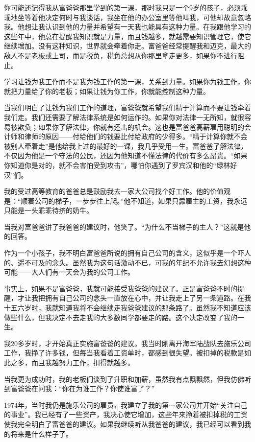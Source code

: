 你可能还记得我从富爸爸那里学到的第一课，那时我只是一个9岁的孩子，必须乖乖地坐等着他决定何时与我谈话，我坐在他的办公室里等他叫我，可他却故意忽略我。他想让我认识到他的力量并希望有一天我也能具有这种力量。在我跟他学习的这些年中，他总在提醒我知识就是力量，而且钱越多，就越需要知识管理它，使它继续增加。没有这种知识，世界就会牵着你走。富爸爸经常提醒我和迈克，最大的敌人不是老板或上司，而是税负，税负总想从你那里拿走更多，如果你不进行阻止。

学习让钱为我工作而不是我为钱工作的第一课，关系到力量。如果你为钱工作，你就把力量给了你的老板；如果让钱为你工作，你就能控制这种力量。

当我们明白了让钱为我们工作的道理，富爸爸就希望我们精于计算而不要让钱牵着我们走。我们还需要了解法律系统是如何运作的。如果你对法律一无所知，就很容易被欺负；如果你了解法律，你就有还击的机会。这也是富爸爸高薪雇用聪明的会计师和律师的原因——付给他们的钱要比付给政府的少得多。“精于计算你就不会被别人牵着走”是他给我上过的最好的一课，我几乎受用一生。富爸爸了解法律，不仅因为他是一个守法的公民，还因为他知道不懂法律的代价有多么昂贵。“如果你知道你是对的，就不会害怕受到攻击”，哪怕你遇到了罗宾汉和他的“绿林好汉”们。

我的受过高等教育的爸爸总是鼓励我去一家大公司找个好工作。他的价值观是：“顺着公司的梯子，一步步往上爬。”他不知道，如果只靠雇主的工资，我永远只能是一头乖乖待挤的奶牛。

当我对富爸爸讲了我爸爸的建议时，他笑了。“为什么不当梯子的主人？”这就是他的回答。

作为一个小孩子，我不明白富爸爸所说的拥有自己公司的含义，这似乎是一个吓人的、遥不可及的念头。虽然我为这句话激动不已，可我的年纪不允许我去幻想这种可能——大人们有一天会为我的公司工作。

事实上，如果不是富爸爸，我就可能接受我爸爸的建议了。正是富爸爸不时的提醒，才让我把拥有自己公司的念头一直放在心中，并让我走上了另一条道路。在我十五六岁时，我就知道我将不会继续走我爸爸建议的那条路了。虽然我不知道应该做些什么，但我决定不去走我的大多数同学都要走的路。这个决定改变了我的一生。

我20多岁时，才开始真正实施富爸爸的建议。我当时刚离开海军陆战队去施乐公司工作，我挣了许多钱，但每当我看着工资单时，都感到很失望。被扣掉的税款是如此之多，而且我越努力工作，扣得就越多。

当我更为成功时，我的老板们谈到了升职和加薪，虽然我有点飘飘然，但我仿佛听到富爸爸在问我：“你在为谁工作？你使谁富了？”

1974年，当时我仍是施乐公司的雇员，我建立了我的第一家公司并开始“关注自己的事业”。我已经有了一些资产，我决心使它增加，这些年来挣着被扣掉税的工资使我完全明白了富爸爸的建议。如果我继续听从我爸爸的建议，我已经可以看到我的将来是什么样子了。

